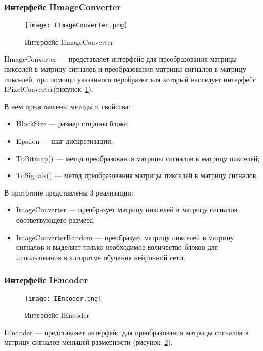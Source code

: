 \subsubsection{Интерфейс IImageConverter}
\label{subsub:development:types:iimageconverter}

\begin{figure}[ht]
\centering
  \texttt{[image: IImageConverter.png]}
  \caption{ Интерфейс IImageConverter }
  \label{fig:iimageconverter}
\end{figure}
IImageConverter --- представляет интерфейс для преобразования матрицы пикселей в матрицу сигналов и
преобразования матрицы сигналов в матрицу пикселей, при помощи указанного перобразвателя который наследует интерфейс IPixelConverter(рисунок~\ref{fig:iimageconverter}).

В нем представлены методы и свойства:
\begin{itemize}
  \item BlockSize --- размер стороны блока;
  \item Epsilon --- шаг дискретизации;
  \item ToBitmap() --- метод преобразования матрицы сигналов в матрицу пикселей;
  \item ToSignals() --- метод преобразования матрицы пикселей в матрицу сигналов.
\end{itemize}

В прототипе представлены 3 реализации:
\begin{itemize}
  \item ImageConverter --- преобразует матрицу пикселей в матрицу сигналов соответвующего размера;
  \item ImageConverterRandom --- преобразует матрицу пикселей в матрицу сигналов и выделяет только необходимое
  количество блоков для использования в алгоритме обучения нейронной сети.
\end{itemize}

\subsubsection{Интерфейс IEncoder}
\label{subsub:development:types:iencoder}

\begin{figure}[ht]
\centering
  \texttt{[image: IEncoder.png]}
  \caption{ Интерфейс IEncoder }
  \label{fig:iencoder}
\end{figure}
IEncoder --- представляет интерфейс для преобразования матрицы сигналов в матрицу сигналов меньшей размерности (рисунок~\ref{fig:iencoder}).

